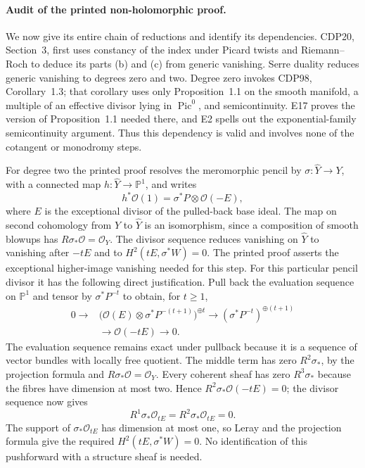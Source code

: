 \paragraph{Audit of the printed non-holomorphic proof.}
We now give its entire chain of reductions and identify its
dependencies. CDP20, Section~3, first uses constancy of the index
under Picard twists and Riemann--Roch to deduce its parts (b)
and (c) from generic vanishing. Serre duality reduces generic
vanishing to degrees zero and two. Degree zero invokes CDP98,
Corollary~1.3; that corollary uses only Proposition~1.1 on the
smooth manifold, a multiple of an effective divisor lying in
$\operatorname{Pic}^0$, and semicontinuity. E17 proves the
version of Proposition~1.1 needed there, and E2 spells out the
exponential-family semicontinuity argument. Thus this dependency
is valid and involves none of the cotangent or monodromy steps.

For degree two the printed proof resolves the meromorphic pencil
by $\sigma:\widehat Y\to Y$, with a connected map
$h:\widehat Y\to\mathbb P^1$, and writes
\[
 h^*\mathcal O(1)=\sigma^*P\otimes\mathcal O(-E),
\]
where $E$ is the exceptional divisor of the pulled-back base
ideal. The map on second cohomology from $Y$ to $\widehat Y$
is an isomorphism, since a composition of smooth blowups has
$R\sigma_*\mathcal O=\mathcal O_Y$. The divisor sequence
reduces vanishing on $\widehat Y$ to vanishing after $-tE$
and to $H^2(tE,\sigma^*W)=0$. The printed proof asserts
the exceptional higher-image vanishing needed for this step.
For this particular pencil divisor it has the following direct
justification. Pull back the evaluation sequence on $\mathbb P^1$
and tensor by $\sigma^*P^{-t}$ to obtain, for $t\geq1$,
\[
\begin{split}
0\longrightarrow&\bigl(\mathcal O(E)\otimes
              \sigma^*P^{-(t+1)}\bigr)^{\oplus t}
 \longrightarrow(\sigma^*P^{-t})^{\oplus(t+1)}\\
 &\longrightarrow\mathcal O(-tE)\longrightarrow0.
\end{split}
\]
The evaluation sequence remains exact under pullback because it
is a sequence of vector bundles with locally free quotient.
The middle term has zero $R^2\sigma_*$, by the projection
formula and $R\sigma_*\mathcal O=\mathcal O_Y$.
Every coherent sheaf has zero $R^3\sigma_*$ because the
fibres have dimension at most two. Hence
$R^2\sigma_*\mathcal O(-tE)=0$; the divisor sequence now gives
\[
 R^1\sigma_*\mathcal O_{tE}=
 R^2\sigma_*\mathcal O_{tE}=0.
\]
The support of $\sigma_*\mathcal O_{tE}$ has dimension at most
one, so Leray and the projection formula give the required
$H^2(tE,\sigma^*W)=0$. No identification of this pushforward
with a structure sheaf is needed.

